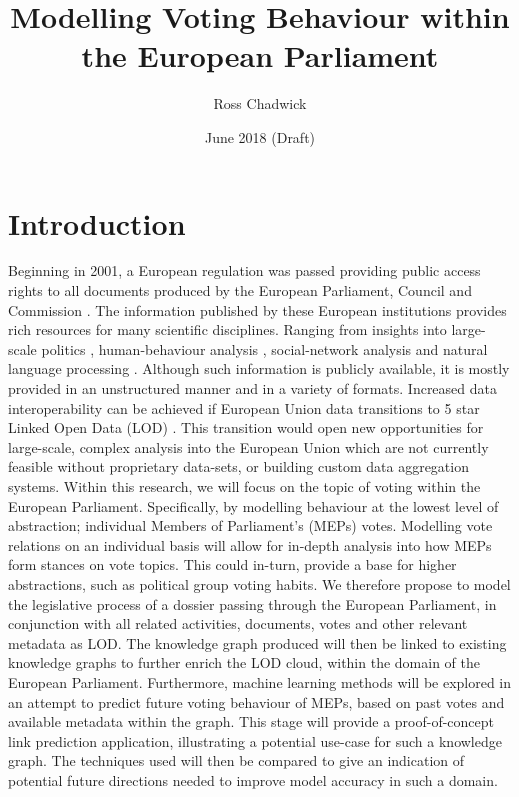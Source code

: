 \documentclass{article}
\title{Modelling Voting Behaviour within the European Parliament}
\author[1]{ Ross Chadwick }
\affil[1]{(Department of Computer Science, Vrije Universiteit Amsterdam)}
\date{June 2018 (Draft)}
\begin{document}
\maketitle

\section{Introduction}
Beginning in 2001, a European regulation was passed providing public access rights to all documents produced by the European Parliament, Council and Commission \cite{EURegulation2001}.
The information published by these European institutions provides rich resources for many scientific disciplines. Ranging from insights into large-scale politics \cite{Hoyland2014PredictingPA, Greene2015UnveilingTP, Hix2009VotingPA}, human-behaviour analysis \cite{Meserve2007PoliticalAA}, social-network analysis \cite{Cherepnalkoski2016RetweetNO, Cherepnalkoski2016CohesionAC, Cherepnalkoski2015ARN, NetworksAttila} and natural language processing \cite{Koehn2005EuroparlAP, Hajlaoui2014DCEPC}.
\newline
Although such information is publicly available, it is mostly provided in an unstructured manner and in a variety of formats. Increased data interoperability can be achieved if European Union data transitions to 5 star Linked Open Data (LOD) \cite{opendataRanking}. This transition would open new opportunities for large-scale, complex analysis into the European Union which are not currently feasible without proprietary data-sets, or building custom data aggregation systems.
\newline
Within this research, we will focus on the topic of voting within the European Parliament. Specifically, by modelling behaviour at the lowest level of abstraction; individual Members of Parliament's (MEPs) votes. Modelling vote relations on an individual basis will allow for in-depth analysis into how MEPs form stances on vote topics. This could in-turn, provide a base for higher abstractions, such as political group voting habits.
\newline
We therefore propose to model the legislative process of a dossier passing through the European Parliament, in conjunction with all related activities, documents, votes and other relevant metadata as LOD.
The knowledge graph produced will then be linked to existing knowledge graphs to further enrich the LOD cloud, within the domain of the European Parliament.
\newline
Furthermore, machine learning methods will be explored in an attempt to predict future voting behaviour of MEPs, based on past votes and available metadata within the graph. This stage will provide a proof-of-concept link prediction application, illustrating a potential use-case for such a knowledge graph. The techniques used will then be compared to give an indication of potential future directions needed to improve model accuracy in such a domain.
\end{document}
